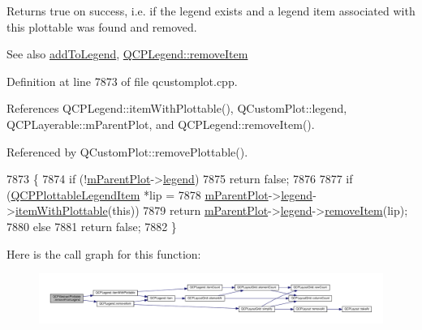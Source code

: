 Returns true on success, i.\+e. if the legend exists and a legend item associated with this plottable was found and removed.

\begin{DoxySeeAlso}{See also}
\hyperlink{class_q_c_p_abstract_plottable_a70f8cabfd808f7d5204b9f18c45c13f5}{add\+To\+Legend}, \hyperlink{class_q_c_p_legend_ac91595c3eaa746fe6321d2eb952c63bb}{Q\+C\+P\+Legend\+::remove\+Item} 
\end{DoxySeeAlso}


Definition at line 7873 of file qcustomplot.\+cpp.



References Q\+C\+P\+Legend\+::item\+With\+Plottable(), Q\+Custom\+Plot\+::legend, Q\+C\+P\+Layerable\+::m\+Parent\+Plot, and Q\+C\+P\+Legend\+::remove\+Item().



Referenced by Q\+Custom\+Plot\+::remove\+Plottable().


\begin{DoxyCode}
7873                                                   \{
7874   \textcolor{keywordflow}{if} (!\hyperlink{class_q_c_p_layerable_aa2a528433e44db02b8aef23c1f9f90ed}{mParentPlot}->\hyperlink{class_q_custom_plot_a4eadcd237dc6a09938b68b16877fa6af}{legend})
7875     \textcolor{keywordflow}{return} \textcolor{keyword}{false};
7876 
7877   \textcolor{keywordflow}{if} (\hyperlink{class_q_c_p_plottable_legend_item}{QCPPlottableLegendItem} *lip =
7878           \hyperlink{class_q_c_p_layerable_aa2a528433e44db02b8aef23c1f9f90ed}{mParentPlot}->\hyperlink{class_q_custom_plot_a4eadcd237dc6a09938b68b16877fa6af}{legend}->\hyperlink{class_q_c_p_legend_a5ee80cf83f65e3b6dd386942ee3cc1ee}{itemWithPlottable}(\textcolor{keyword}{this}))
7879     \textcolor{keywordflow}{return} \hyperlink{class_q_c_p_layerable_aa2a528433e44db02b8aef23c1f9f90ed}{mParentPlot}->\hyperlink{class_q_custom_plot_a4eadcd237dc6a09938b68b16877fa6af}{legend}->\hyperlink{class_q_c_p_legend_ac91595c3eaa746fe6321d2eb952c63bb}{removeItem}(lip);
7880   \textcolor{keywordflow}{else}
7881     \textcolor{keywordflow}{return} \textcolor{keyword}{false};
7882 \}
\end{DoxyCode}


Here is the call graph for this function\+:\nopagebreak
\begin{figure}[H]
\begin{center}
\leavevmode
\includegraphics[width=350pt]{class_q_c_p_abstract_plottable_aa1f350e510326d012b9a9c9249736c83_cgraph}
\end{center}
\end{figure}




